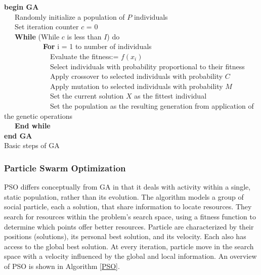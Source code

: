 \documentclass{tamuccthesis}
\begin{document}
\begin{algorithm}%
\textbf{begin GA}\\
~~~Randomly initialize a population of $P$ individuals\\
~~~Set iteration counter $c$ = 0 \\
~~~\textbf{While} (While $c$ is less than $I$) do\\
~~~~~~~~~~~\textbf{For} i = 1 to number of individuals \\
 ~~~~~~~~~~~~~Evaluate the fitness:= $ f(x_i)$\\
 ~~~~~~~~~~~~~Select individuals with probability proportional to their fitness \\
 ~~~~~~~~~~~~~Apply crossover to selected individuals with probability $C$\\
 ~~~~~~~~~~~~~Apply mutation to selected individuals with probability $M$ \\
 ~~~~~~~~~~~~~Set the current solution $X$ as the fittest individual \\
 ~~~~~~~~~~~~~Set the population as the resulting generation from application of the genetic operations\\
~~~\textbf{End while} \\
\textbf{end GA}\\
\caption{Basic steps of GA}
\label{GA}
\end{algorithm}

\subsubsection{Particle Swarm Optimization}

PSO differs conceptually from GA in that it deals with activity within a single, static population, rather than its evolution. The algorithm models a group of social particle, each a solution, that share information to locate resources. They search for resources within the problem's search space, using a fitness function to determine which points offer better resources. Particle are characterized by their positions (solutions), its personal best solution, and its velocity. Each also has access to the global best solution. At every iteration, particle move in the search space with a velocity influenced by the global and local information. An overview of PSO is shown in Algorithm \ref{PSO}.
\end{document}
